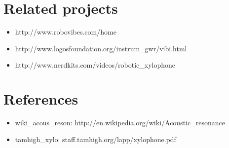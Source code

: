 \documentclass[12pt]{article}
\begin{document}
\newpage
\section{Related projects}
\begin{itemize}
\item http://www.robovibes.com/home
\item http://www.logosfoundation.org/instrum\_gwr/vibi.html
\item http://www.nerdkits.com/videos/robotic\_xylophone
\end{itemize}

\newpage
\section{References}
\begin{itemize}
\item wiki\_acous\_reson: http://en.wikipedia.org/wiki/Acoustic\_resonance
\item tamhigh\_xylo: staff.tamhigh.org/lapp/xylophone.pdf
\end{itemize}
\end{document}
